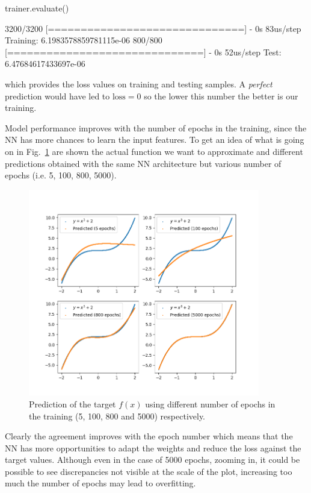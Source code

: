 \begin{ipython}
trainer.evaluate()
\end{ipython}
\begin{ioutput}
3200/3200 [==============================] - 0s 83us/step
Training: 6.1983578859781115e-06
800/800 [==============================] - 0s 52us/step
Test: 6.47684617433697e-06
\end{ioutput}
\noindent
which provides the loss values on training and testing samples.
A \emph{perfect} prediction would have led to \(\textrm{loss}=0\) so the lower this number the better is our training. 

Model performance improves with the number of epochs in the training, since the NN has more chances to learn the input features. To get an idea of what is going on in Fig.~\ref{fig:training_vs_epochs} are shown the actual function we want to approximate and different predictions obtained with the same NN architecture but various number of epochs (i.e. 5, 100, 800, 5000).

\begin{figure}[htb]
\centering
\includegraphics[width=0.9\textwidth]{figures/training_vs_epoch}
\caption{Prediction of the target $f(x)$ using different number of epochs in the training (5, 100, 800 and 5000) respectively.}
\label{fig:training_vs_epochs}
\end{figure}

Clearly the agreement improves with the epoch number which means that the NN has more opportunities to adapt the weights and reduce the loss against the target values. Although even in the case of 5000 epochs, zooming in, it could be possible to see discrepancies not visible at the scale of the plot, increasing too much the number of epochs may lead to overfitting. 

